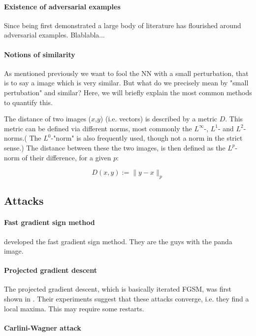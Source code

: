 \documentclass{article}
\begin{document}
\paragraph{Existence of adversarial examples}
Since being first demonstrated \cite{Szegedy13} a large body of literature has flourished around adversarial examples. Blablabla...

\paragraph{Notions of similarity}
As mentioned previously we want to fool the NN with a small perturbation, that is to say a image which is very similar. But what do we precisely mean by "small pertubation" and similar? Here, we will briefly explain the most common methods to quantify this.

The distance of two images ($x$,$y$) (i.e. vectors) is described by a metric $D$. This metric can be defined via different norms, most commonly the $L^\infty$-, $L^1$- and $L^2$-norms.( The $L^0$-"norm" is also frequently used, though not a norm in the strict sense.) The distance between these the two images, is then defined as the $L^p$-norm of their difference, for a given $p$:

\begin{equation}
	D(x,y) := \| y - x \|_p
\end{equation}


\subsection{Attacks}

\paragraph{Fast gradient sign method}
\cite{goodfellow2014explaining} developed the fast gradient sign method. They are the guys with the panda image.

\paragraph{Projected gradient descent}
The projected gradient descent, which is basically iterated FGSM, was first shown in \cite{madry2017towards}. Their experiments suggest that these attacks converge, i.e. they find a local maxima. This may require some restarts.

\paragraph{Carlini-Wagner attack}
\end{document}
